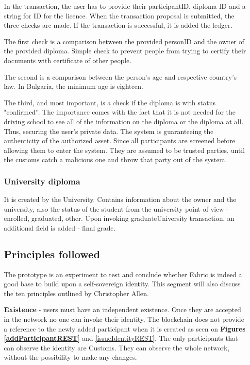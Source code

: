 \documentclass[a4paper,11pt]{report}
\begin{document}
	In the transaction, the user has to provide their participantID, diploma ID and a string for ID for the licence. When the transaction proposal is submitted, the three checks are made. If the transaction is successful, it is added the ledger. 

	The first check is a comparison between the provided personID and the owner of the provided diploma. Simple check to prevent people from trying to certify their documents with certificate of other people.
	
	The second is a comparison between the person’s age and respective country's law. In Bulgaria, the minimum age is eighteen. 
	
	The third, and most important, is a check if the diploma is with status "confirmed". The importance comes with the fact that it is not needed for the driving school to see all of the information on the diploma or the diploma at all. Thus, securing the user's private data. The system is guaranteeing the authenticity of the authorized asset. Since all participants are screened before allowing them to enter the system. They are assumed to be trusted parties, until the customs catch a malicious one and throw that party out of the system. 


\subsubsection{University diploma}
It is created by the University. Contains information about the owner and the university, also the status of the student from the university point of view - enrolled, graduated, other. Upon invoking graduateUniversity transaction, an additional field is added - final grade.
\subsection{Principles followed}
The prototype is an experiment to test and conclude whether Fabric is indeed a good base to build upon a self-sovereign identity. This segment will also discuss the ten principles outlined by Christopher Allen.
	
	\textbf{Existence}  - users must have an independent existence. Once they are accepted in the network no one can invoke their identity. The blockchain does not provide a reference to the newly added participant when it is created as seen on \textbf{Figures \ref{addParticipantREST}} and \ref{issueIdentityREST}. The only participants that can observe the identity are Customs. They can observe the whole network, without the possibility to make any changes. 
\\
\end{document}
